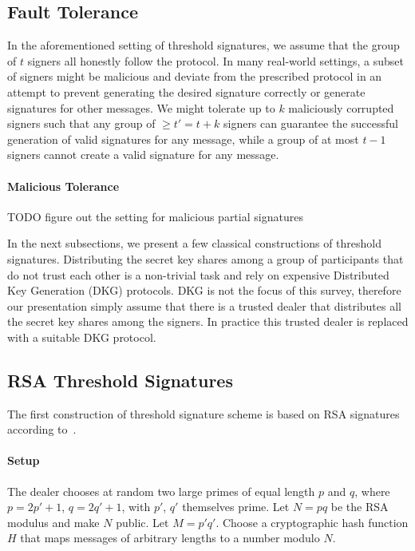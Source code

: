 \subsection{Fault Tolerance} 
In the aforementioned setting of threshold signatures, we assume that the group of $t$ signers all honestly follow the protocol. In many real-world settings, a subset of signers might be malicious and deviate from the prescribed protocol in an attempt to prevent generating the desired signature correctly or generate signatures for other messages. We might tolerate up to $k$ maliciously corrupted signers such that any group of $\ge t'=t+k$ signers can guarantee the successful generation of valid signatures for any message, while a group of at most $t-1$ signers cannot create a valid signature for any message. 

\paragraph{Malicious Tolerance} {\color{red} TODO figure out the setting for malicious partial signatures}

\par In the next subsections, we present a few classical constructions of threshold signatures. Distributing the secret key shares among a group of participants that do not trust each other is a non-trivial task and rely on expensive Distributed Key Generation (DKG) protocols. DKG is not the focus of this survey, therefore our presentation simply assume that there is a trusted dealer that distributes all the secret key shares among the signers. In practice this trusted dealer is replaced with a suitable DKG protocol. 

\subsection{RSA Threshold Signatures}
The first construction of threshold signature scheme is based on RSA signatures according to~\cite{DBLP:conf/eurocrypt/Shoup00}. 

\paragraph{Setup} The dealer chooses at random two large primes of equal length $p$ and $q$, where $p=2p' + 1$, $q=2q'+1$, with $p'$, $q'$ themselves prime. Let $N=pq$ be the RSA modulus and make $N$ public. Let $M=p'q'$. Choose a cryptographic hash function $H$ that maps messages of arbitrary lengths to a number modulo $N$. 

